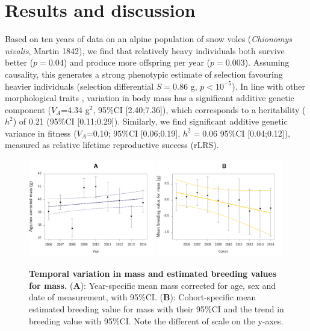 \section{Results and discussion}
Based on ten years of data on an alpine population of snow voles \parencite{Garcia-Navas2015,Bonnet2016} (\textit{Chionomys nivalis}, Martin 1842), we find that relatively heavy individuals both survive better ($p=0.04$) and produce more offspring per year ($p=0.003$). Assuming causality, this generates a strong phenotypic estimate of selection favouring heavier individuals (selection differential $S=0.86$ g, $p< 10^{-5}$). In line with other morphological traits \parencite{Mousseau1987,Postma2014}, variation in body mass has a significant additive genetic component ($V_A$=4.34 g$^2$, 95\%CI [2.40;7.36]), which corresponds to a heritability ($h^2$) of 0.21 (95\%CI [0.11;0.29]). Similarly, we find significant additive genetic variance in fitness ($V_A$=0.10; 95\%CI [0.06;0.19], $h^2=0.06$ 95\%CI [0.04;0.12]), measured as relative lifetime reproductive success (rLRS).

\begin{figure}[h]
\begin{center}
\includegraphics[width=0.49\textwidth]{FiguresStasis/PhenoTrends-1}
\includegraphics[width=0.49\textwidth]{FiguresStasis/BlupsTrendMass-1}
\end{center}
\caption{\footnotesize\textbf{Temporal variation in mass and estimated breeding values for mass.} (\textbf{A}): Year-specific mean mass corrected for age, sex and date of measurement, with 95\%CI. (\textbf{B}): Cohort-specific mean estimated breeding value for mass with their 95\%CI and the trend in breeding value with 95\%CI. Note the different of scale on the y-axes.}
\label{fig:trends}
\end{figure}


